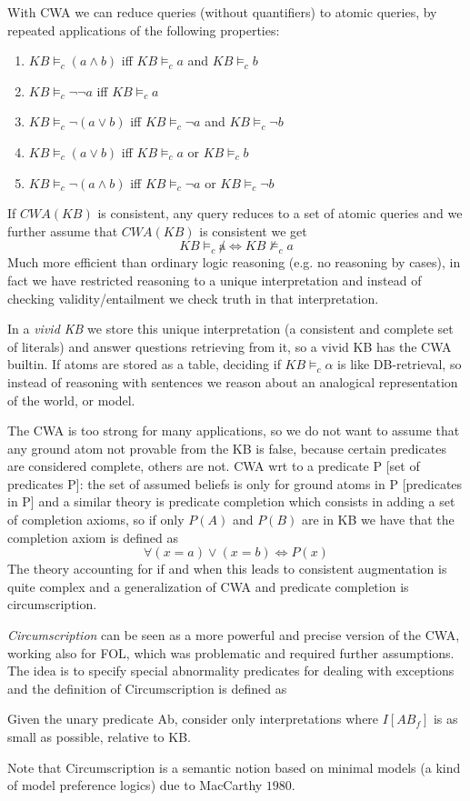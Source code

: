 With CWA we can reduce queries (without quantifiers) to atomic queries, by
repeated applications of the following properties:
\begin{enumerate}
    \item $KB \models_c (a \wedge b)$ iff $KB \models_c a$ and $KB \models_c b$
    \item $KB \models_c \neg \neg a$ iff $KB \models_c a$
    \item $KB \models_c \neg (a \vee b)$ iff 
	  $KB \models_c \neg a$ and $KB \models_c \neg b$
    \item $KB \models_c (a \vee b)$ iff $KB \models_c a$ or $KB \models_c b$
    \item $KB \models_c \neg(a \wedge b)$ iff
	  $KB \models_c \neg a$ or $KB \models_c \neg b$
\end{enumerate}
If $CWA(KB)$ is consistent, any query reduces to a set of atomic queries and we further
assume that $CWA(KB)$ is consistent we get
\[ KB \models_c \not a \iff KB \not \models_c a \] 
Much more efficient than ordinary logic reasoning (e.g. no reasoning by cases),
in fact we have restricted reasoning to a unique interpretation and instead of
checking validity/entailment we check truth in that interpretation.

In a \emph{vivid KB} we store this unique interpretation (a consistent and complete
set of literals) and answer questions retrieving from it, so a vivid KB
has the CWA builtin.\newline
If atoms are stored as a table, deciding if $KB \models_c \alpha$ is like DB-retrieval,
so instead of reasoning with sentences we reason about an analogical
representation of the world, or model.

The CWA is too strong for many applications, so we do not want to assume that any
ground atom not provable from the KB is false, because certain predicates
are considered complete, others are not.\newline
CWA wrt to a predicate P [set of predicates P]: the set of assumed beliefs is only
for ground atoms in P [predicates in P] and a similar theory is predicate completion
which consists in adding a set of completion axioms, so if only $P(A)$ and $P(B)$
are in KB we have that the completion axiom is defined as 
\[ \forall (x = a) \vee (x = b) \iff P(x) \]
The theory accounting for if and when this leads to consistent augmentation is
quite complex and a generalization of CWA and predicate completion is circumscription.

\emph{Circumscription} can be seen as a more powerful and precise version of the CWA,
working also for FOL, which was problematic and required further assumptions.\newline
The idea is to specify special abnormality predicates for dealing with exceptions and 
the definition of Circumscription is defined as 
\begin{defi}[Circumscription]
    Given the unary predicate Ab, consider only interpretations where $I[AB_f]$
    is as small as possible, relative to KB.
\end{defi}
Note that Circumscription is a semantic notion based on minimal models (a kind of
model preference logics) due to MacCarthy $1980$.

